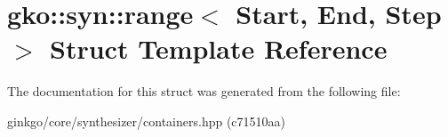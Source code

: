 \hypertarget{structgko_1_1syn_1_1range}{}\section{gko\+:\+:syn\+:\+:range$<$ Start, End, Step $>$ Struct Template Reference}
\label{structgko_1_1syn_1_1range}


The documentation for this struct was generated from the following file\+:\begin{DoxyCompactItemize}
\item 
ginkgo/core/synthesizer/containers.\+hpp (c71510aa)\end{DoxyCompactItemize}
